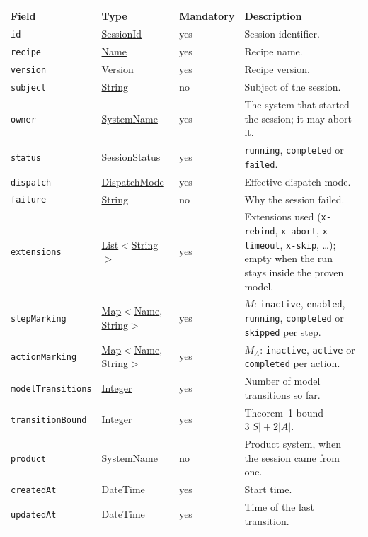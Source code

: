 \documentclass[a4paper]{arrowhead}
\newcommand{\mref}[1]{{\textcolor{ArrowheadPurple}{\hyperref[sec:model:#1]{#1}}}}
\newcommand{\pref}[1]{{\textcolor{ArrowheadGrey}{\hyperref[sec:model:primitives:#1]{#1}}}}
\begin{document}
{\small
\begin{longtable}{|p{3.7cm}|p{4.2cm}|p{1.6cm}|p{6.3cm}|}

\hline
\rowcolor{gray!33} Field & Type & Mandatory & Description \\ \hline
\endhead
\texttt{id} & \pref{SessionId} & yes & Session identifier. \\ \hline
\texttt{recipe} & \pref{Name} & yes & Recipe name. \\ \hline
\texttt{version} & \pref{Version} & yes & Recipe version. \\ \hline
\texttt{subject} & \pref{String} & no & Subject of the session. \\ \hline
\texttt{owner} & \pref{SystemName} & yes & The system that started the session; it may abort it. \\ \hline
\texttt{status} & \mref{SessionStatus} & yes & \texttt{running}, \texttt{completed} or \texttt{failed}. \\ \hline
\texttt{dispatch} & \mref{DispatchMode} & yes & Effective dispatch mode. \\ \hline
\texttt{failure} & \pref{String} & no & Why the session failed. \\ \hline
\texttt{extensions} & \pref{List}$<$\pref{String}$>$ & yes & Extensions used (\texttt{x-rebind}, \texttt{x-abort}, \texttt{x-timeout}, \texttt{x-skip}, \ldots); empty when the run stays inside the proven model. \\ \hline
\texttt{stepMarking} & \pref{Map}$<$\pref{Name}, \pref{String}$>$ & yes & $M$: \texttt{inactive}, \texttt{enabled}, \texttt{running}, \texttt{completed} or \texttt{skipped} per step. \\ \hline
\texttt{actionMarking} & \pref{Map}$<$\pref{Name}, \pref{String}$>$ & yes & $M_A$: \texttt{inactive}, \texttt{active} or \texttt{completed} per action. \\ \hline
\texttt{modelTransitions} & \pref{Integer} & yes & Number of model transitions so far. \\ \hline
\texttt{transitionBound} & \pref{Integer} & yes & Theorem~1 bound $3|S| + 2|A|$. \\ \hline
\texttt{product} & \pref{SystemName} & no & Product system, when the session came from one. \\ \hline
\texttt{createdAt} & \pref{DateTime} & yes & Start time. \\ \hline
\texttt{updatedAt} & \pref{DateTime} & yes & Time of the last transition. \\ \hline
\end{longtable}
}
\end{document}
